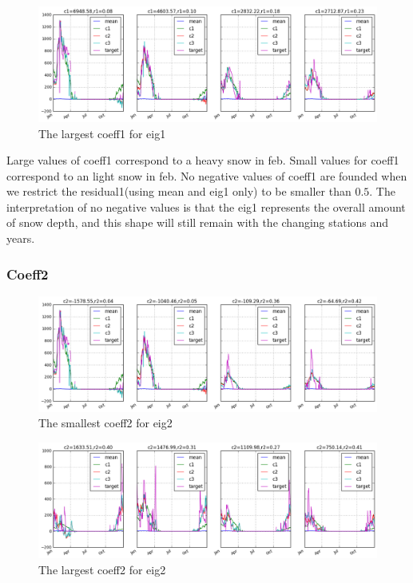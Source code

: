 \documentclass{article}
\begin{document}
\begin{figure}[H]
\centering
\includegraphics[width=15cm]{../figures/3_2_coeff1_largest}
\caption{The largest coeff1 for eig1}
\end{figure}

Large values of coeff1 correspond to a heavy snow in feb. Small values for coeff1 correspond to an light snow in feb. No negative values of coeff1 are founded when we restrict the residual1(using mean and eig1 only) to be smaller than $0.5$. The interpretation of no negative values is that the eig1 represents the overall amount of snow depth, and this shape will still remain with the changing stations and years.


\subsubsection*{Coeff2}

\begin{figure}[H]
\centering
\includegraphics[width=15cm]{../figures/3_2_coeff2_smallest}
\caption{The smallest coeff2 for eig2}
\end{figure}

\begin{figure}[H]
\centering
\includegraphics[width=15cm]{../figures/3_2_coeff2_largest}
\caption{The largest coeff2 for eig2}
\end{figure}
\end{document}
